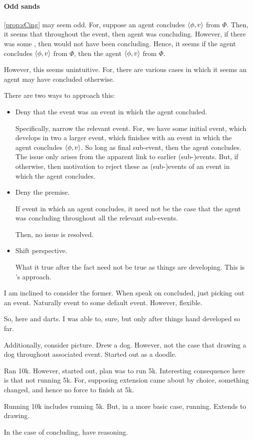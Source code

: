 \paragraph{Odd sands}

\begin{note}
  \autoref{prop:sCing} may seem odd.
  For, suppose an agent concludes \(\langle \phi, v \rangle\) from \(\Phi\).
  Then, it seems that throughout the event, then agent was concluding.
  However, if there was some \curb{}, then would not have been concluding.
  Hence, it seems if the agent concludes \(\langle \phi, v \rangle\) from \(\Phi\), then the agent \sCe{} \(\langle \phi, v \rangle\) from \(\Phi\).

  However, this seems unintuitive.
  For, there are various cases in which it seems an agent may have concluded otherwise.

  There are two ways to approach this:
  \begin{itemize}
  \item
    Deny that the event was an event in which the agent concluded.

    Specifically, narrow the relevant event.
    For, we have some initial event, which develops in two a larger event, which finishes with an event in which the agent concludes \(\langle \phi, v \rangle\).
    So long as final sub-event, then the agent concludes.
    The issue only arises from the apparent link to earlier (sub-)events.
    But, if otherwise, then motivation to reject these as (sub-)events of an event in which the agent concludes.
  \item
    Deny the premise.

    If event in which an agent concludes, it need not be the case that the agent was concluding throughout all the relevant sub-events.

    Then, no issue is resolved.
  \item
    Shift perspective.

    What it true after the fact need not be true as things are developing.
    This is \citeauthor{Boylan:2020aa}'s approach.
  \end{itemize}

  I am inclined to consider the former.
  When speak on concluded, just picking out an event.
  Naturally event to some default event.
  However, flexible.

  So, here \citeauthor{Boylan:2020aa} and darts.
  I was able to, sure, but only after things hand developed so far.

  Additionally, consider picture.
  Drew a dog.
  However, not the case that drawing a dog throughout associated event.
  Started out as a doodle.

  Ran 10k.
  However, started out, plan was to run 5k.
  Interesting consequence here is that not running 5k.
  For, supposing extension came about by choice, something changed, and hence no force to finish at 5k.

  Running 10k includes running 5k.
  But, in a more basic case, running.
  Extends to drawing.

  In the case of concluding, have reasoning.
\end{note}


